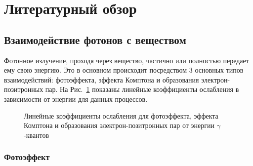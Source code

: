 %
%

\section{Литературный обзор}\label{ch:overview}

\subsection{Взаимодействие фотонов с веществом}

Фотонное излучение, проходя через вещество, частично или полностью передает ему свою энергию. Это  в основном происходит посредством 3 основных типов взаимодействий: фотоэффекта, эффекта Комптона и образования электрон-позитронных пар. На Рис.~\ref{img:mu} показаны линейные коэффициенты ослабления в зависимости от энергии для данных процессов.

\begin{figure}[h!]
	\caption{Линейные коэффициенты ослабления для фотоэффекта, эффекта Комптона и образования электрон-позитронных пар от энергии \(\gamma\)-квантов}
	\label{img:mu}
\end{figure}

\subsubsection{Фотоэффект} 

